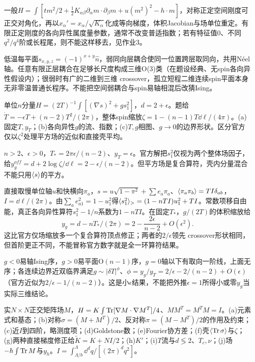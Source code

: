 \begin{solution}
一般$H=\int[t m^2/2+\tfrac12K_{\alpha\beta}\partial_\alpha m\cdot\partial_\beta m+u(m^2)^2-h\cdot m]$，对称正定空间刚度可正交对角化，再以$x_\alpha'=x_\alpha/\sqrt{K_\alpha}$化成等向梯度，体积Jacobian与场单位重定。有限正定刚度的各向异性属度量参数，通常不改变普适指数；若有特征值0、不同$q^2/q^4$阶或长程尾，则不能这样移去，见作业3。

低温每平面$s_{x,y,z}=(-1)^{x+y}\hat n$，弱同向层耦合使同一位置跨层取同向，共用Néel轴。任意有限正层耦合在足够长尺度构成三维O(3)类（在题设经典、无spin各向异性假设内）；很弱时有广的二维到三维 crossover，孤立短程二维连续spin平面本身无非零温普通长程序。不能把空间弱耦合与spin易轴相混后改猜Ising。
\end{solution}
\begin{exercise}[原题9(a)--(c)]\label{r:334-3-9}
单位$n$分量$H=(2T)^{-1}\int[(\nabla s)^2+gs_1^2]$，$d=2+\epsilon$。题给$\dot T=-\epsilon T+(n-2)T^2/(2\pi)$，整体spin缩放$\zeta=1-(n-1)T\dd\ell/(4\pi)$。(a)固定$T,y_T$；(b)各向异性$g$的流、指数；(c)$T,g$相图、$g\to0$的边界形状。区分官方仅以$\zeta^2$处理平方场的近似和直接壳平均。
\end{exercise}
\begin{solution}
$n>2$、$\epsilon>0$，$T_*=2\pi\epsilon/(n-2)$、$y_T=\epsilon$。官方解把$s_1^2$仅视为两个整体场因子，给$y_g^{off}=d+2\log\zeta/\dd\ell=2-\epsilon/(n-2)$。但平方场是复合算符，壳内分量混合不能只用$\langle s\rangle$的平方。

直接取慢单位轴$u$和快横向$\pi_a$，$s=u\sqrt{1-\pi^2}+\sum e_a\pi_a$、$\langle \pi_a\pi_b\rangle=TI\delta_{ab}$，$I=\dd\ell/(2\pi)$。由$\sum_ae_{a1}^2=1-u_1^2$得$\langle s_1^2\rangle_>=(1-nTI)u_1^2+TI$。常数项移自由能，真正各向异性算符$s_1^2-1/n$系数为$1-nTI$。在固定$T_*$，$g/(2T)$的体积缩放给
\begin{equation}
y_g=d-nT_*/(2\pi)=2-\frac{2\epsilon}{n-2}+O(\epsilon^2).
\end{equation}
这比官方仅场缩放多一个复合算符顶点修正；两者的$2/\epsilon$领先 crossover形状相同，但首阶更正不同，不能冒称官方数字就是全一环算符结果。

$g<0$易轴Ising序，$g>0$易平面O$(n-1)$序，$g=0$轴以下有取向一阶线，上面无序；各连续边界近双临界满足$g\sim|\delta T|^\phi$、$\phi=y_g/y_T=2/\epsilon-2/(n-2)+O(\epsilon)$（官方近似为$2/\epsilon-1/(n-2)$）。这是小$\epsilon$结果，不能把外推$\epsilon=1$所得小或零$y_g$当实际三维结论。
\end{solution}
\begin{exercise}[原题10(a)--(j)]\label{r:334-3-10}
实$N\times N$正交矩阵场$M$，$H=K\int\operatorname{Tr}[\nabla M\cdot\nabla M^T]/4$、$MM^T=M^TM=I$。(a)元素式和基态；(b)对称$\sigma=(M+M^T)/2$、反对称$\pi=(M-M^T)/2$的作用及约束；(c)近$I$到四阶，略测度项；(d)Goldstone数；(e)Fourier协方差；(f)壳$\langle \operatorname{Tr}\sigma\rangle$与$\zeta$；(g)两种直接梯度修正给$\widetilde K=K+NI/2$；(h)$K'$；(i)$T$流与$d\lessgtr2$、$T_c,\nu$；(j)场$-h\int\operatorname{Tr} M$与$y_h$。$I=\int_{\Lambda/b}^\Lambda\dd^dq/[(2\pi)^dq^2]$。
\end{exercise}
